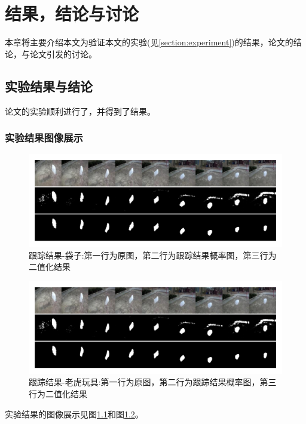 
\chapter{结果，结论与讨论}
本章将主要介绍本文为验证本文的实验(见\ref{section:experiment})的结果，论文的结论，与论文引发的讨论。
\section{实验结果与结论}
论文的实验顺利进行了，并得到了结果。
\subsection{实验结果图像展示}
\par
\begin{figure}
    \centering
    \includegraphics[width = 1.\textwidth]{chap/img/result_bag.pdf}
    \caption{跟踪结果-袋子:第一行为原图，第二行为跟踪结果概率图，第三行为二值化结果}
    \label{fig:result_bag}
\end{figure}
\par
\begin{figure}
    \centering
    \includegraphics[width = 1.\textwidth]{chap/img/result_bag.pdf}
    \caption{跟踪结果-老虎玩具:第一行为原图，第二行为跟踪结果概率图，第三行为二值化结果}
    \label{fig:result_tiger}
\end{figure}
\par
实验结果的图像展示见图\ref{fig:result_bag}和图\ref{fig:result_tiger}。
\par
